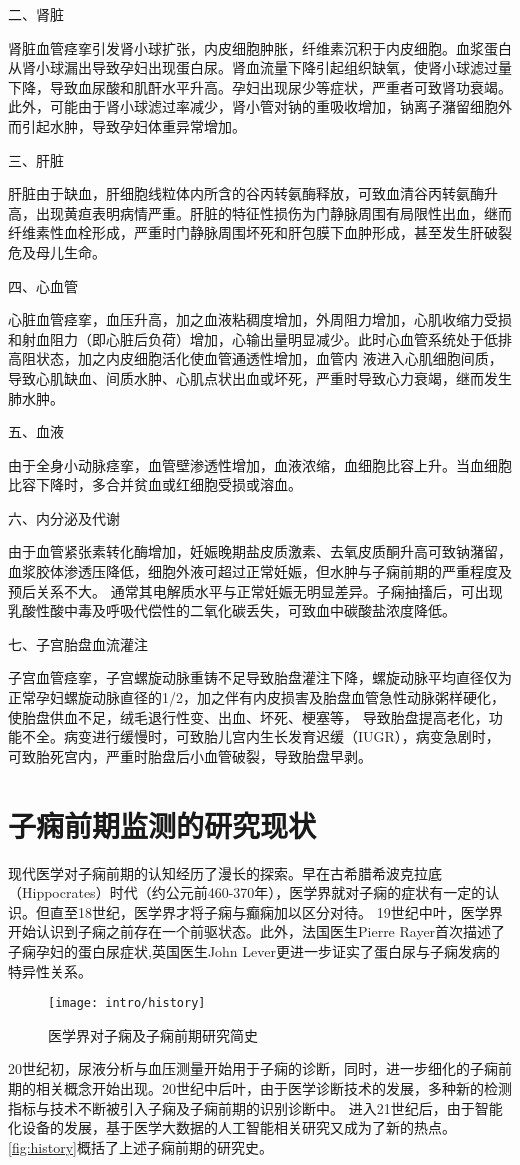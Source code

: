 二、肾脏

肾脏血管痉挛引发肾小球扩张，内皮细胞肿胀，纤维素沉积于内皮细胞。血浆蛋白从肾小球漏出导致孕妇出现蛋白尿。肾血流量下降引起组织缺氧，使肾小球滤过量下降，导致血尿酸和肌酐水平升高。孕妇出现尿少等症状，严重者可致肾功衰竭。
此外，可能由于肾小球滤过率减少，肾小管对钠的重吸收增加，钠离子潴留细胞外而引起水肿，导致孕妇体重异常增加。

三、肝脏

肝脏由于缺血，肝细胞线粒体内所含的谷丙转氨酶释放，可致血清谷丙转氨酶升高，出现黄疸表明病情严重。肝脏的特征性损伤为门静脉周围有局限性出血，继而纤维素性血栓形成，严重时门静脉周围坏死和肝包膜下血肿形成，甚至发生肝破裂危及母儿生命。

四、心血管

心脏血管痉挛，血压升高，加之血液粘稠度增加，外周阻力增加，心肌收缩力受损和射血阻力（即心脏后负荷）增加，心输出量明显减少。此时心血管系统处于低排高阻状态，加之内皮细胞活化使血管通透性增加，血管内
液进入心肌细胞间质，导致心肌缺血、间质水肿、心肌点状出血或坏死，严重时导致心力衰竭，继而发生肺水肿。

五、血液

由于全身小动脉痉挛，血管壁渗透性增加，血液浓缩，血细胞比容上升。当血细胞比容下降时，多合并贫血或红细胞受损或溶血。

六、内分泌及代谢

由于血管紧张素转化酶增加，妊娠晚期盐皮质激素、去氧皮质酮升高可致钠潴留，血浆胶体渗透压降低，细胞外液可超过正常妊娠，但水肿与子痫前期的严重程度及预后关系不大。
通常其电解质水平与正常妊娠无明显差异。子痫抽搐后，可出现乳酸性酸中毒及呼吸代偿性的二氧化碳丢失，可致血中碳酸盐浓度降低。

七、子宫胎盘血流灌注

子宫血管痉挛，子宫螺旋动脉重铸不足导致胎盘灌注下降，螺旋动脉平均直径仅为正常孕妇螺旋动脉直径的1/2，加之伴有内皮损害及胎盘血管急性动脉粥样硬化，使胎盘供血不足，绒毛退行性变、出血、坏死、梗塞等，
导致胎盘提高老化，功能不全。病变进行缓慢时，可致胎儿宫内生长发育迟缓（IUGR），病变急剧时，可致胎死宫内，严重时胎盘后小血管破裂，导致胎盘早剥。

\section{子痫前期监测的研究现状}
现代医学对子痫前期的认知经历了漫长的探索\cite{BJOG2016}。早在古希腊希波克拉底（Hippocrates）时代（约公元前460-370年），医学界就对子痫的症状有一定的认识。但直至18世纪，医学界才将子痫与癫痫加以区分对待。
19世纪中叶，医学界开始认识到子痫之前存在一个前驱状态。此外，法国医生Pierre Rayer首次描述了子痫孕妇的蛋白尿症状,英国医生John Lever更进一步证实了蛋白尿与子痫发病的特异性关系。
\begin{figure}[htbp]
    \centering
    \texttt{[image: intro/history]}
    \caption{\label{fig:history}医学界对子痫及子痫前期研究简史}
\end{figure}
20世纪初，尿液分析与血压测量开始用于子痫的诊断，同时，进一步细化的子痫前期的相关概念开始出现。20世纪中后叶，由于医学诊断技术的发展，多种新的检测指标与技术不断被引入子痫及子痫前期的识别诊断中。
进入21世纪后，由于智能化设备的发展，基于医学大数据的人工智能相关研究又成为了新的热点。\autoref{fig:history}概括了上述子痫前期的研究史。

